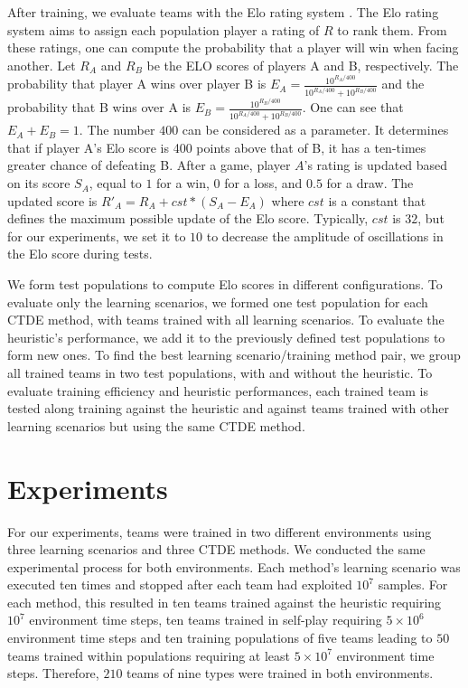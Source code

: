 After training, we evaluate teams with the Elo rating system \citep{elo1978rating}.
The Elo rating system aims to assign each population player a rating of $R$ to rank them.
From these ratings, one can compute the probability that a player will win when facing another.
Let $R_A$ and $R_B$ be the ELO scores of players A and B, respectively.
The probability that player A wins over player B is $E_A=\frac{10^{R_A/400}}{10^{R_A/400} + 10^{R_B/400}}$ and the probability that B wins over A is $E_B=\frac{10^{R_B/400}}{10^{R_A/400} + 10^{R_B/400}}$.
One can see that $E_A + E_B = 1$.
The number $400$ can be considered as a parameter.
It determines that if player A's Elo score is 400 points above that of B, it has a ten-times greater chance of defeating B.
After a game, player $A$'s rating is updated based on its score $S_A$, equal to $1$ for a win, $0$ for a loss, and $0.5$ for a draw.
The updated score is $R'_A = R_A + cst * (S_A - E_A)$ where $cst$ is a constant that defines the maximum possible update of the Elo score.
Typically, $cst$ is $32$, but for our experiments, we set it to $10$ to decrease the amplitude of oscillations in the Elo score during tests.

We form test populations to compute Elo scores in different configurations.
To evaluate only the learning scenarios, we formed one test population for each CTDE method, with teams trained with all learning scenarios.
To evaluate the heuristic's performance, we add it to the previously defined test populations to form new ones.
To find the best learning scenario/training method pair, we group all trained teams in two test populations, with and without the heuristic.
To evaluate training efficiency and heuristic performances, each trained team is tested along training against the heuristic and against teams trained with other learning scenarios but using the same CTDE method.

\section{Experiments} \label{sec:ch7_experiments}

For our experiments, teams were trained in two different environments using three learning scenarios and three CTDE methods.
We conducted the same experimental process for both environments.
Each method's learning scenario was executed ten times and stopped after each team had exploited $10^7$ samples.
For each method, this resulted in ten teams trained against the heuristic requiring $10^7$ environment time steps, ten teams trained in self-play requiring $5\times10^6$ environment time steps and ten training populations of five teams leading to $50$ teams trained within populations requiring at least $5\times10^7$ environment time steps.
Therefore, $210$ teams of nine types were trained in both environments.

